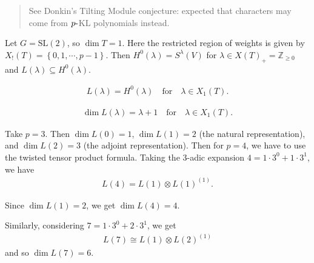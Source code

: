 \begin{quote}
See Donkin's Tilting Module conjecture: expected that characters may
come from \(p{\hbox{-}}\)KL polynomials instead.
\end{quote}

\begin{example}

\begin{example}

Let \(G= {\text{SL}}(2)\), so \(\dim T =1\). Here the restricted region
of weights is given by \(X_!(T) = \left\{{0,1,\cdots, p-1}\right\}\).
Then \(H^0(\lambda) = S^\lambda(V)\) for
\(\lambda \in X(T)_+ = {\mathbb{Z}}_{\geq 0}\) and
\(L(\lambda) \subseteq H^0(\lambda)\).

\begin{theorem}[?]

\begin{theorem}[?]

\begin{align*}   L(\lambda) =  H^0(\lambda) {\quad \text{for} \quad} \lambda \in X_1(T) .\end{align*}

\end{theorem}

\end{theorem}

\begin{theorem}[?]

\begin{theorem}[?]

\begin{align*}   \dim L(\lambda) = \lambda + 1 {\quad \text{for} \quad} \lambda \in X_1(T) .\end{align*}

\end{theorem}

\end{theorem}

Take \(p=3\). Then \(\dim L(0) = 1\), \(\dim L(1) = 2\) (the natural
representation), and \(\dim L(2) = 3\) (the adjoint representation).
Then for \(p=4\), we have to use the twisted tensor product formula.
Taking the 3-adic expansion \(4 = 1\cdot 3^0 + 1\cdot 3^1\), we have
\begin{align*}   L(4) = L(1) \otimes L(1)^{(1)} .\end{align*}

Since \(\dim L(1) = 2\), we get \(\dim L(4) = 4\).

Similarly, considering \(7 = 1\cdot 3^0 + 2\cdot 3^1\), we get
\begin{align*}   L(7) \cong L(1) \otimes L(2)^{(1)} \end{align*} and so
\(\dim L(7) = 6\).


\end{example}
\end{example}
